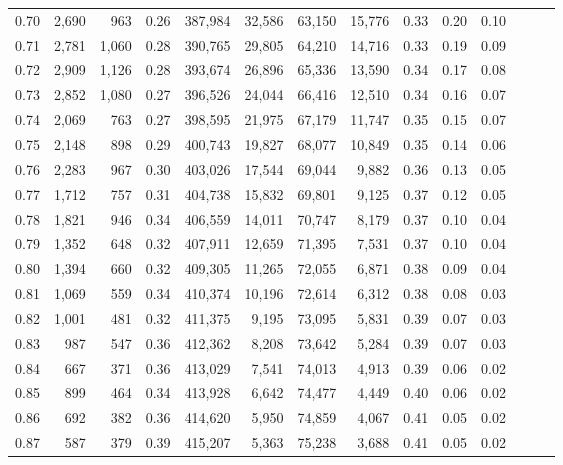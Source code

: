 \begin{tabular}{rrrrrrrrrrrrrr}
0.70 &   2,690 &    963 &  0.26 &  387,984 &   32,586 &  63,150 &  15,776 &  0.33 &  0.20 &      0.10 \\
0.71 &   2,781 &  1,060 &  0.28 &  390,765 &   29,805 &  64,210 &  14,716 &  0.33 &  0.19 &      0.09 \\
0.72 &   2,909 &  1,126 &  0.28 &  393,674 &   26,896 &  65,336 &  13,590 &  0.34 &  0.17 &      0.08 \\
0.73 &   2,852 &  1,080 &  0.27 &  396,526 &   24,044 &  66,416 &  12,510 &  0.34 &  0.16 &      0.07 \\
0.74 &   2,069 &    763 &  0.27 &  398,595 &   21,975 &  67,179 &  11,747 &  0.35 &  0.15 &      0.07 \\
0.75 &   2,148 &    898 &  0.29 &  400,743 &   19,827 &  68,077 &  10,849 &  0.35 &  0.14 &      0.06 \\
0.76 &   2,283 &    967 &  0.30 &  403,026 &   17,544 &  69,044 &   9,882 &  0.36 &  0.13 &      0.05 \\
0.77 &   1,712 &    757 &  0.31 &  404,738 &   15,832 &  69,801 &   9,125 &  0.37 &  0.12 &      0.05 \\
0.78 &   1,821 &    946 &  0.34 &  406,559 &   14,011 &  70,747 &   8,179 &  0.37 &  0.10 &      0.04 \\
0.79 &   1,352 &    648 &  0.32 &  407,911 &   12,659 &  71,395 &   7,531 &  0.37 &  0.10 &      0.04 \\
0.80 &   1,394 &    660 &  0.32 &  409,305 &   11,265 &  72,055 &   6,871 &  0.38 &  0.09 &      0.04 \\
0.81 &   1,069 &    559 &  0.34 &  410,374 &   10,196 &  72,614 &   6,312 &  0.38 &  0.08 &      0.03 \\
0.82 &   1,001 &    481 &  0.32 &  411,375 &    9,195 &  73,095 &   5,831 &  0.39 &  0.07 &      0.03 \\
0.83 &     987 &    547 &  0.36 &  412,362 &    8,208 &  73,642 &   5,284 &  0.39 &  0.07 &      0.03 \\
0.84 &     667 &    371 &  0.36 &  413,029 &    7,541 &  74,013 &   4,913 &  0.39 &  0.06 &      0.02 \\
0.85 &     899 &    464 &  0.34 &  413,928 &    6,642 &  74,477 &   4,449 &  0.40 &  0.06 &      0.02 \\
0.86 &     692 &    382 &  0.36 &  414,620 &    5,950 &  74,859 &   4,067 &  0.41 &  0.05 &      0.02 \\
0.87 &     587 &    379 &  0.39 &  415,207 &    5,363 &  75,238 &   3,688 &  0.41 &  0.05 &      0.02 \\

\end{tabular}
